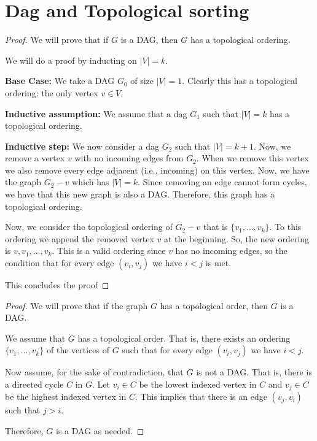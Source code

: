 \documentclass[twoside]{article}
\begin{document}
\section{Dag and Topological sorting}
\begin{proof}
    We will prove that if $G$ is a DAG, then $G$ has a topological ordering.

    We will do a proof by inducting on $\lvert V \rvert = k$.

    \textbf{Base Case:} We take a DAG $G_{0}$ of size $\lvert V \rvert = 1$. Clearly this has a topological ordering: the only vertex $v \in V$.

    \textbf{Inductive assumption:} We assume that a dag $G_{1}$ such that $\lvert V \rvert = k$ has a topological ordering.

    \textbf{Inductive step:} We now consider a dag $G_{2}$ such that $\lvert V \rvert = k + 1$. Now, we remove a vertex $v$ with no incoming
    edges from $G_{2}$. When we remove this vertex we also remove every edge adjacent (i.e., incoming) on this vertex. Now, we have the
    graph $G_{2} - v$ which has $\lvert V \rvert = k$. Since removing an edge cannot form cycles, we have that this new graph is also a
    DAG. Therefore, this graph has a topological ordering.

    Now, we consider the topological ordering of $G_{2} - v$ that is $\{v_{1}, \dots, v_{k}\}$. To this ordering we append the removed
    vertex $v$ at the beginning. So, the new ordering is $v, v_{1}, \dots, v_{k}$. This is a valid ordering since $v$ has no incoming
    edges, so the condition that for every edge $(v_{i}, v_{j})$ we have $i < j$ is met.

    This concludes the proof
\end{proof}

\begin{proof}
    We will prove that if the graph $G$ has a topological order, then $G$ is a DAG.

    We assume that $G$ has a topological order. That is, there exists an ordering $\{v_{1}, \dots, v_{k}\}$ of the vertices of $G$ such
    that for every edge $(v_{i}, v_{j})$ we have $i < j$.

    Now assume, for the sake of contradiction, that $G$ is not a DAG. That is, there is a directed cycle 
    $C$ in $G$. Let $v_{i} \in C$ be the lowest indexed vertex in $C$ and $v_{j} \in C$ be the 
    highest indexed vertex in $C$. This implies that there is an edge $(v_{j}, v_{i})$ such that $j > i$. \contra

    Therefore, $G$ is a DAG as needed.
\end{proof}
\end{document}
